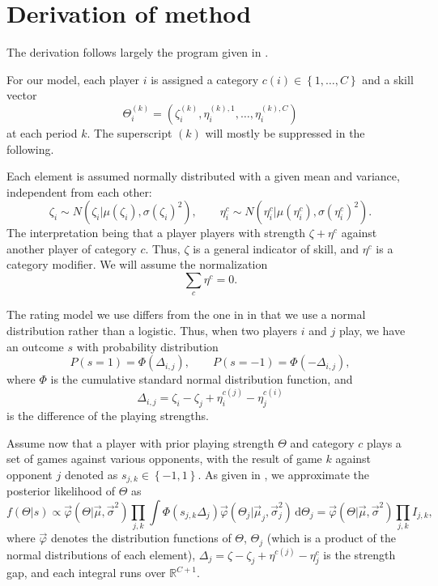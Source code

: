 \documentclass[a4paper, twoside, notitlepage, 11pt]{article}
\newcommand{\R}{\mathbb{R}}
\newcommand{\dd}{\,\mathrm{d}}
\begin{document}
\section{Derivation of method}

The derivation follows largely the program given in \cite{Glickman99}.

For our model, each player $i$ is assigned a category
$c(i)\in\left\{1,\ldots,C\right\}$ and a skill vector
$$
    \Theta^{(k)}_i = \left(\zeta^{(k)}_i, \eta^{(k),1}_i, \ldots,
    \eta^{(k),C}_i\right)
$$
at each period $k$. The superscript $(k)$ will mostly be suppressed in the
following.

Each element is assumed normally distributed with a given mean and variance,
independent from each other:
$$
    \zeta_i \sim N(\zeta_i|\mu(\zeta_i),\sigma(\zeta_i)^2), \qquad
    \eta^c_i \sim N(\eta^c_i|\mu(\eta^c_i),\sigma(\eta^c_i)^2).
$$
The interpretation being that a player players with strength $\zeta+\eta^c$
against another player of category $c$. Thus, $\zeta$ is a general indicator of
skill, and $\eta^c$ is a category modifier. We will assume the normalization
$$
    \sum_c \eta^c = 0.
$$

The rating model we use differs from the one in \cite{Glickman99} in that we
use a normal distribution rather than a logistic. Thus, when two players $i$
and $j$ play, we have an outcome $s$ with probability distribution
$$
    P(s=1) = \Phi(\Delta_{i,j}), \qquad P(s=-1) = \Phi(-\Delta_{i,j}),
$$
where $\Phi$ is the cumulative standard normal distribution function, and
$$
    \Delta_{i,j} = \zeta_i - \zeta_j + \eta^{c(j)}_i - \eta^{c(i)}_j
$$
is the difference of the playing strengths.

Assume now that a player with prior playing strength $\Theta$ and category $c$
plays a set of games against various opponents, with the result of game $k$
against opponent $j$ denoted as $s_{j,k}\in\left\{-1,1\right\}$. As given in
\cite{Glickman99}, we approximate the posterior likelihood of $\Theta$ as
$$
    f(\Theta|s) \propto \vec{\varphi}(\Theta|\vec{\mu},\vec{\sigma}^2)\prod_{j,k}
    \int\Phi(s_{j,k}\Delta_j)\vec{\varphi}(\Theta_j|\vec{\mu}_j,\vec{\sigma}_j^2)
    \dd\Theta_j = \vec{\varphi}(\Theta|\vec{\mu},\vec{\sigma}^2)\prod_{j,k}
    I_{j,k},
$$
where $\vec{\varphi}$ denotes the distribution functions of $\Theta$,
$\Theta_j$ (which is a product of the normal distributions of each element),
$\Delta_j = \zeta-\zeta_j + \eta^{c(j)}-\eta^c_j$ is the strength gap, and each
integral runs over $\R^{C+1}$.
\end{document}
